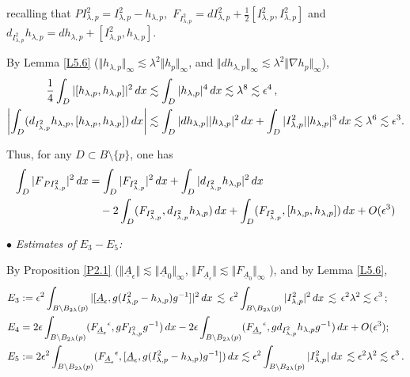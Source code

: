 \documentclass[11pt]{article}
\numberwithin{equation}{section} \setlength{\topmargin}{-35pt}
\begin{document}
\noindent recalling that $PI^2_{\lambda,p}=
I^2_{\lambda,p}-h_{\lambda,p},$
$F_{I^2_{\lambda,p}}=dI^2_{\lambda,p}+\frac{1}{2}[I^2_{\lambda,p},I^2_{\lambda,p}]$
and
$d_{I^2_{\lambda,p}}h_{\lambda,p}=dh_{\lambda,p}+[I^2_{\lambda,p},h_{\lambda,p}]$.

\noindent By Lemma \ref{L5.6} ($\Vert h_{\lambda,p}\Vert_\infty
\lesssim \lambda^2\Vert h_{p}\Vert_\infty$, and $\Vert
dh_{\lambda,p}\Vert_\infty \lesssim\lambda^2\Vert \nabla
h_{p}\Vert_\infty$),
\begin{align}
  \frac{1}{4}\int_{D}|[h_{\lambda,p},h_{\lambda,p}]|^2\,dx&\lesssim\int_{D}|h_{\lambda,p}|^4\,dx
  \lesssim\lambda^8\lesssim\epsilon^4\,,\notag\\
 \biggl|\int_{D}(d_{I^2_{\lambda,p}}h_{\lambda,p},[h_{\lambda,p},h_{\lambda,p}])\,dx\biggr|
&\lesssim\int_{D}|dh_{\lambda,p}||h_{\lambda,p}|^2\,dx+\int_{D}|I^2_{\lambda,p}||h_{\lambda,p}|^3\,dx
\lesssim\lambda^6\lesssim\epsilon^3.\notag
\end{align}

\noindent Thus, for any $D\subset B\setminus \{p\}$, one has
\begin{align}
\label{*}  \int_{D}|F_{\,PI^2_{\lambda,p}}|^2\,dx&=
\int_{D}|F_{I^2_{\lambda,p}}|^2\,dx+
\int_{D}|d_{I^2_{\lambda,p}}h_{\lambda,p}|^2\,dx\notag\\
&\quad-2\int_{D}(F_{I^2_{\lambda,p}},d_{I^2_{\lambda,p}}h_{\lambda,p})\,dx+
\int_{D}(F_{I^2_{\lambda,p}},[h_{\lambda,p},h_{\lambda,p}])\,dx+
O(\epsilon^3)
\end{align}

\noindent $\bullet$ \emph{Estimates of $E_3-E_5$:}

By Proposition \ref{P2.1} ($\Vert \underline A_\epsilon\Vert
\lesssim \Vert \underline A_0\Vert_\infty$, $\Vert F_{\underline
A_\epsilon}\Vert \lesssim \Vert F_{\underline A_0}\Vert_\infty$ ),
and by Lemma \ref{L5.6},
\begin{align}
  &E_3 :=\epsilon^2 \int_{B\setminus B_{2\lambda}(p)}\vert
[\underline A_\epsilon,g(I^2_{\lambda,p}-
h_{\lambda,p})g^{-1}]\vert^2\,dx
\,\lesssim\,\epsilon^2\int_{B\setminus
B_{2\lambda}(p)}|I^2_{\lambda,p}|^2\,dx\,\lesssim\,\epsilon^2\lambda^2\lesssim\epsilon^3\,;\notag\\
  &E_4= 2\epsilon\int_{B\setminus B_{2\lambda}(p)}({F_{\underline
A_\epsilon}}^{\epsilon},gF_{I^2_{\lambda,p}}g^{-1})\,dx-2\epsilon\int_{B\setminus
B_{2\lambda}(p)}({F_{\underline
A_\epsilon}}^{\epsilon},gd_{I^2_{\lambda,p}}h_{\lambda,p}g^{-1})\,dx+
O(\epsilon^3);\notag\\
  &E_5:=
 2\epsilon^2\int_{B\setminus B_{2\lambda}(p)}({F_{\underline
A_\epsilon }}^{\epsilon},[\underline A_\epsilon , g(I^2_{\lambda,p}-
h_{\lambda,p})g^{-1}])\,dx\lesssim\epsilon^2\int_{B\setminus
B_{2\lambda}(p)}|I^2_{\lambda,p}|\,dx\,\lesssim\epsilon^2\lambda^2\lesssim
\epsilon^3\,.\notag\\
\notag
\end{align}
\end{document}
